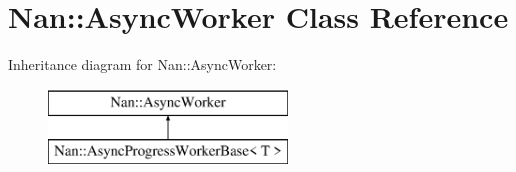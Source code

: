 \hypertarget{class_nan_1_1_async_worker}{}\section{Nan\+:\+:Async\+Worker Class Reference}
\label{class_nan_1_1_async_worker}
Inheritance diagram for Nan\+:\+:Async\+Worker\+:\begin{figure}[H]
\begin{center}
\leavevmode
\includegraphics[height=2.000000cm]{class_nan_1_1_async_worker}
\end{center}
\end{figure}
